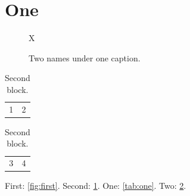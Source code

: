 \documentclass{article}
\begin{document}
\section{One}

\begin{figure}
\centering
X
\caption{Two names under one caption.}
\label{fig:first}
\label{fig:second}
\end{figure}

\begin{table}
\centering
\begin{tabular}{cc}1&2\end{tabular}
\caption{First block.}
\label{tab:one}
\begin{tabular}{cc}3&4\end{tabular}
\caption{Second block.}
\label{tab:two}
\end{table}

First: \ref{fig:first}. Second: \ref{fig:second}.
One: \ref{tab:one}. Two: \ref{tab:two}.
\end{document}
